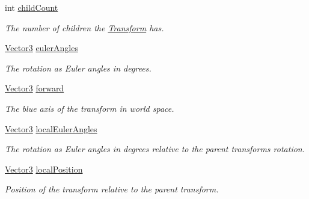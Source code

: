 \begin{DoxyCompactItemize}
\item 
int \mbox{\hyperlink{class_lua_1_1_transform_a9d77f87171bcb8090f086ae405c4f89e}{child\+Count}}
\begin{DoxyCompactList}\small\item\em The number of children the \mbox{\hyperlink{class_lua_1_1_transform}{Transform}} has. \end{DoxyCompactList}\item 
\mbox{\hyperlink{class_lua_1_1_vector3}{Vector3}} \mbox{\hyperlink{class_lua_1_1_transform_ad9a5f0534a08dc2d6cb9ad32b6581b8d}{euler\+Angles}}
\begin{DoxyCompactList}\small\item\em The rotation as Euler angles in degrees. \end{DoxyCompactList}\item 
\mbox{\hyperlink{class_lua_1_1_vector3}{Vector3}} \mbox{\hyperlink{class_lua_1_1_transform_ad07cf6c2802bfbab50272030379f1826}{forward}}
\begin{DoxyCompactList}\small\item\em The blue axis of the transform in world space. \end{DoxyCompactList}\item 
\mbox{\hyperlink{class_lua_1_1_vector3}{Vector3}} \mbox{\hyperlink{class_lua_1_1_transform_a7923f3c584b87b8e56de6b32acbfba99}{local\+Euler\+Angles}}
\begin{DoxyCompactList}\small\item\em The rotation as Euler angles in degrees relative to the parent transform\textquotesingle{}s rotation. \end{DoxyCompactList}\item 
\mbox{\hyperlink{class_lua_1_1_vector3}{Vector3}} \mbox{\hyperlink{class_lua_1_1_transform_ab081c482002c1e4fedbcfa090b19b90e}{local\+Position}}
\begin{DoxyCompactList}\small\item\em Position of the transform relative to the parent transform. \end{DoxyCompactList}\item 

\end{DoxyCompactItemize}
